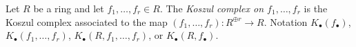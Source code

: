 \begin{definition}
\label{definition-koszul-complex}
Let $R$ be a ring and let $f_1, \ldots, f_r \in R$. The
{\it Koszul complex on $f_1, \ldots, f_r$} is the Koszul complex
associated to the map $(f_1, \ldots, f_r) : R^{\oplus r} \to R$.
Notation $K_\bullet(f_\bullet)$, $K_\bullet(f_1, \ldots, f_r)$,
$K_\bullet(R, f_1, \ldots, f_r)$, or $K_\bullet(R, f_\bullet)$.
\end{definition}